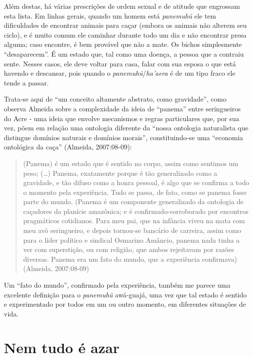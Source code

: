 Além destas, há várias prescrições de ordem sexual e de atitude que
engrossam esta lista. Em linhas gerais, quando um homem está
\emph{panemuhũ} ele tem dificuldades de encontrar animais para caçar
(embora os animais não alterem seu ciclo), e é muito comum ele caminhar
durante todo um dia e não encontrar presa alguma; caso encontre, é bem
provável que não a mate. Os bichos simplesmente ``desaparecem''. É um
estado que, tal como uma doença, a pessoa que a contraiu sente. Nesses
casos, ele deve voltar para casa, falar com sua esposa o que está
havendo e descansar, pois quando o \emph{panemuhũ}/\emph{ha'aera} é de
um tipo fraco ele tende a passar.

Trata-se aqui de ``um conceito altamente abstrato, como gravidade'',
como observa Almeida sobre a complexidade da ideia de ``panema'' entre
seringueiros do Acre - uma ideia que envolve mecanismos e regras
particulares que, por sua vez, põem em relação uma ontologia diferente
da ``nossa ontologia naturalista que distingue domínios naturais e
domínios morais'', constituindo-se uma ``economia ontológica da caça''
(Almeida, 2007:08-09):

\begin{quote}
(Panema) é um estado que é sentido no corpo, assim como sentimos um
peso; (\ldots{}) Panema, exatamente porque é tão generalizado como a
gravidade, e tão difuso como a honra pessoal, é algo que se confirma a
todo o momento pela experiência. Tudo se passa, de fato, como se panema
fosse parte do mundo. (Panema é um componente generalizado da
ontologia de caçadores da planície amazônica; e é confirmado-corroborado
por encontros pragmáticos cotidianos. Para meu pai, que na infância
viveu na mata com meu avô seringueiro, e depois tornou-se bancário de
carreira, assim como para o líder político e sindical Osmarino Amâncio,
panema nada tinha a ver com superstição, ou com religião, que ambos
rejeitavam por razões diversas. Panema era um fato do mundo, que a
experiência confirmava) (Almeida, 2007:08-09)
\end{quote}

Um ``fato do mundo'', confirmado pela experiência, também me parece uma
excelente definição para o \emph{panemuhũ} awá-guajá, uma vez que tal
estado é sentido e experimentado por todos em um ou outro momento, em
diferentes situações de vida.

\section{Nem tudo é azar}

